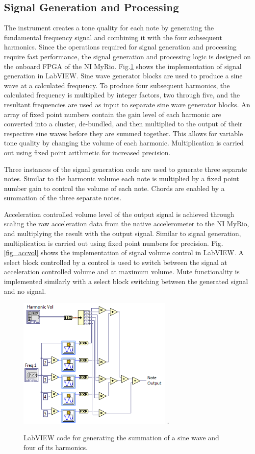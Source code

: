 \subsection{Signal Generation and Processing}
The instrument creates a tone quality for each note by generating the fundamental frequency signal and combining it with the four subsequent harmonics.
 Since the operations required for signal generation and processing require fast performance, the signal generation and processing logic is designed on the onboard FPGA of the NI MyRio.
 Fig.\ref{fig_notegen} shows the implementation of signal generation in LabVIEW. Sine wave generator blocks are used to produce a sine wave at a calculated frequency.
 To produce four subsequent harmonics, the calculated frequency is multiplied by integer factors, two through five, and the resultant frequencies are used as input to separate sine wave generator blocks.
 An array of fixed point numbers contain the gain level of each harmonic are converted into a cluster, de-bundled, and then multiplied to the output of their respective sine waves before they are summed together.
 This allows for variable tone quality by changing the volume of each harmonic. Multiplication is carried out using fixed point arithmetic for increased precision.

Three instances of the signal generation code are used to generate three separate notes.
 Similar to the harmonic volume each note is multiplied by a fixed point number gain to control the volume of each note.
 Chords are enabled by a summation of the three separate notes.

Acceleration controlled volume level of the output signal is achieved through scaling the raw acceleration data from the native accelerometer to the NI MyRio, and multiplying the result with the output signal.
 Similar to signal generation, multiplication is carried out using fixed point numbers for precision.
 Fig.\ref{fig_accvol} shows the implementation of signal volume control in LabVIEW.
 A select block controlled by a control is used to switch between the signal at acceleration controlled volume and at maximum volume.
 Mute functionality is implemented similarly with a select block switching between the generated signal and no signal.


\begin{figure}[!t]
\centering
\includegraphics[width=3in]{NoteGeneration.png}
\DeclareGraphicsExtensions.
\caption{LabVIEW code for generating the summation of a sine wave and four of its harmonics.}
\label{fig_notegen}
\end{figure} 

